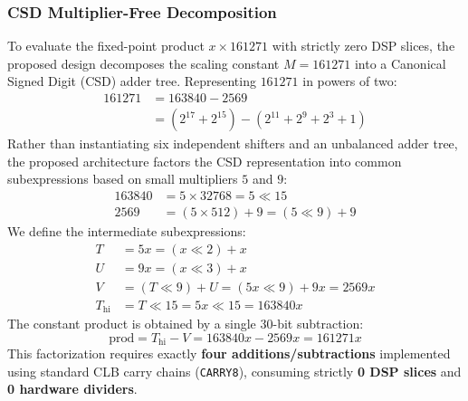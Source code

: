 \subsubsection{CSD Multiplier-Free Decomposition}
To evaluate the fixed-point product $x \times 161271$ with strictly zero DSP slices, the proposed design decomposes the scaling constant $M = 161271$ into a Canonical Signed Digit (CSD) adder tree. Representing $161271$ in powers of two:
\begin{align}
\label{eq:codec_csd_expansion}
161271 &= 163840 - 2569 \nonumber \\
&= (2^{17} + 2^{15}) - (2^{11} + 2^9 + 2^3 + 1)
\end{align}
Rather than instantiating six independent shifters and an unbalanced adder tree, the proposed architecture factors the CSD representation into common subexpressions based on small multipliers $5$ and $9$:
\begin{align}
163840 &= 5 \times 32768 = 5 \ll 15 \\
2569 &= (5 \times 512) + 9 = (5 \ll 9) + 9
\end{align}
We define the intermediate subexpressions:
\begin{align}
T &= 5x = (x \ll 2) + x \label{eq:codec_csd_t} \\
U &= 9x = (x \ll 3) + x \label{eq:codec_csd_u} \\
V &= (T \ll 9) + U = (5x \ll 9) + 9x = 2569x \label{eq:codec_csd_v} \\
T_{\text{hi}} &= T \ll 15 = 5x \ll 15 = 163840x \label{eq:codec_csd_thi}
\end{align}
The constant product is obtained by a single 30-bit subtraction:
\begin{equation}
\label{eq:codec_csd_prod}
\text{prod} = T_{\text{hi}} - V = 163840x - 2569x = 161271x
\end{equation}
This factorization requires exactly \textbf{four additions/subtractions} implemented using standard CLB carry chains (\texttt{CARRY8}), consuming strictly \textbf{0 DSP slices} and \textbf{0 hardware dividers}.

